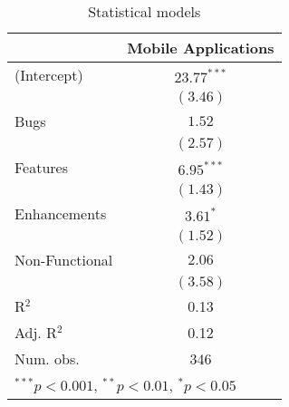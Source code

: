 
\begin{table}
\begin{center}
\begin{tabular}{l c }
\hline
               & Mobile Applications \\
\hline
(Intercept)    & $23.77^{***}$ \\
               & $(3.46)$      \\
Bugs           & $1.52$        \\
               & $(2.57)$      \\
Features       & $6.95^{***}$  \\
               & $(1.43)$      \\
Enhancements   & $3.61^{*}$    \\
               & $(1.52)$      \\
Non-Functional & $2.06$        \\
               & $(3.58)$      \\
\hline
R$^2$          & 0.13          \\
Adj. R$^2$     & 0.12          \\
Num. obs.      & 346           \\
\hline
\multicolumn{2}{l}{\scriptsize{$^{***}p<0.001$, $^{**}p<0.01$, $^*p<0.05$}}
\end{tabular}
\caption{Statistical models}
\label{table:coefficients}
\end{center}
\label{tab:mobileModel}
\end{table}
